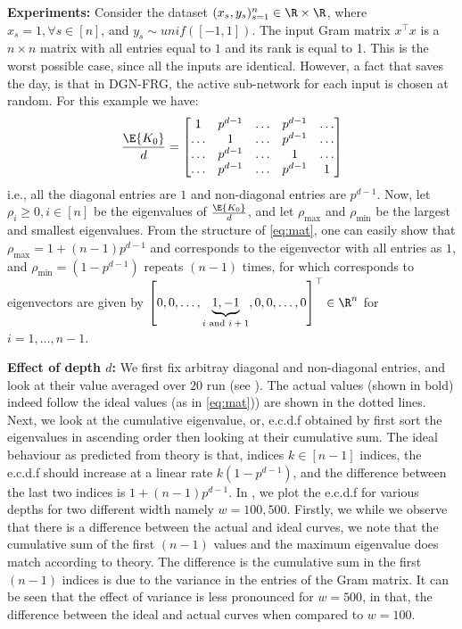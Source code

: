\textbf{Experiments:} Consider the dataset $(x_s,y_s)_{s=1}^n\in \R\times \R$, where $x_s=1,\forall s\in [n]$, and $y_s\sim unif([-1,1])$. The input Gram matrix $x^\top x$ is a $n\times n$ matrix with all entries equal to $1$ and its rank is equal to 1. This is the worst possible case, since all the inputs are identical. However, a fact that saves the day, is that in DGN-FRG, the active sub-network for each input is chosen at random. For this example we have:
\begin{align}\label{eq:mat}
\frac{\E{K_0}}{d}=\left[\begin{matrix}
1 &p^{d-1} &\ldots &p^{d-1} &\ldots\\ 
\ldots &1 &\ldots &p^{d-1} &\ldots\\ 
\ldots &p^{d-1} &\ldots &1 &\ldots \\
\ldots &p^{d-1} &\ldots &p^{d-1} &1\\ 
\end{matrix}\right]
\end{align}
i.e., all the diagonal entries are $1$ and non-diagonal entries are $p^{d-1}$. Now, let $\rho_i\geq 0,i \in [n]$ be the eigenvalues of $\frac{\E{K_0}}{d}$, and let $\rho_{\max}$ and $\rho_{\min}$ be the largest and smallest eigenvalues. From the structure of \eqref{eq:mat}, one can easily show that $\rho_{\max}=1+(n-1)p^{d-1}$ and corresponds to the eigenvector with all entries as $1$, and $\rho_{\min}=(1-p^{d-1})$ repeats $(n-1)$ times, for which corresponds to eigenvectors are given by $\left[0, 0, \ldots, \underbrace{1, -1}_{\text{$i$ and $i+1$}}, 0,0,\ldots, 0\right]^\top \in \R^n$ for $i=1,\ldots,n-1$.


\textbf{Effect of depth $d$:} We first fix arbitray diagonal and non-diagonal entries, and look at their value averaged over $20$ run (see ). The actual values (shown in bold) indeed follow the ideal values (as in \eqref{eq:mat})) are shown in the dotted lines. Next, we look at the cumulative eigenvalue, or, e.c.d.f obtained by first sort the eigenvalues in ascending order then looking at their cumulative sum. The ideal behaviour as predicted from theory is that, indices $k\in[n-1]$ indices, the e.c.d.f should increase at a linear rate $k(1-p^{d-1})$, and the difference between the last two indices is $1+(n-1)p^{d-1}$. In , we plot the e.c.d.f for various depths for two different width namely $w=100,500$. Firstly, we while we observe that there is a difference between the actual and ideal curves, we note that the cumulative sum of the first $(n-1)$ values and the maximum eigenvalue does match according to theory. The difference is the cumulative sum in the first $(n-1)$ indices is due to the variance in the entries of the Gram matrix. It can be seen that the effect of variance is less pronounced for $w=500$, in that, the difference between the ideal and actual curves when compared to $w=100$.

